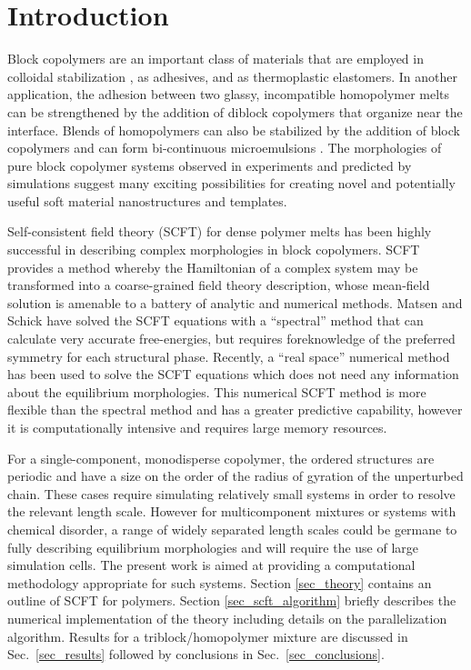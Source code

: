 \documentclass[onecolumn,amsmath,amssymb,floatfix]{elsart}
\begin{document}
\section{Introduction}
\label{sec_intro}


Block copolymers are an important class of materials
that are employed in colloidal stabilization
\cite{napper83_book,russell89_book}, as adhesives, and as
thermoplastic elastomers.
In another application, the adhesion between two glassy,
incompatible homopolymer melts can be strengthened
\cite{brown93_2,kramer94_adhesion_review,kramer96_copoly} by the
addition of diblock copolymers that organize near the interface.
Blends of homopolymers can also be stabilized by the addition of
block copolymers \cite{riess_review75} and can form bi-continuous
microemulsions \cite{bates_microemulsion01}.
The morphologies of pure block copolymer systems observed in experiments
\cite{hamley98_book} and predicted by simulations \cite{drolet99}
suggest many exciting possibilities for creating novel and
potentially useful soft material nanostructures and templates.


Self-consistent field theory (SCFT) for dense polymer melts
\cite{freed72,hong_noolandi81} has been highly successful in
describing complex morphologies in block copolymers.
SCFT provides a method whereby the Hamiltonian of a complex system may be
transformed into a coarse-grained field theory description, whose
mean-field solution is amenable to a battery of analytic and
numerical methods.
Matsen and Schick \cite{matsen_schick94} have
solved the SCFT equations with a ``spectral'' method that can
calculate very accurate free-energies, but requires foreknowledge
of the preferred symmetry for each structural phase.
Recently, a ``real space'' numerical method has been used to solve the SCFT
equations \cite{drolet99,fraaije97,glenn_review_02} which does not need any
information about the equilibrium morphologies.
This numerical SCFT method is more flexible than the spectral method and has a
greater predictive capability, however it is computationally
intensive and requires large memory resources.


For a single-component, monodisperse copolymer, the ordered
structures are periodic and have a size on the order of the radius
of gyration of the unperturbed chain.
These cases require simulating relatively small systems in order to resolve the
relevant length scale.
However for multicomponent mixtures or
systems with chemical disorder, a range of widely separated length
scales could be germane to fully describing equilibrium
morphologies and will require the use of large simulation cells.
The present work is aimed at
providing a computational methodology appropriate for such systems.
Section \ref{sec_theory} contains an outline of  SCFT for
polymers.
Section \ref{sec_scft_algorithm} briefly describes the
numerical implementation of the theory including details on the
parallelization algorithm.
Results for a triblock/homopolymer mixture are discussed in
Sec.~\ref{sec_results} followed by conclusions in Sec.~\ref{sec_conclusions}.
\end{document}
